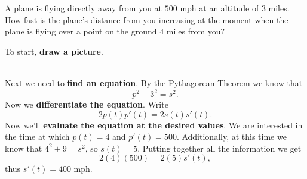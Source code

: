 \begin{example}
    \label{exam:receding airplane}
    A plane is flying directly away from you at $500$ mph at an altitude of
    $3$ miles.  How fast is the plane's distance from you increasing at the
    moment when the plane is flying over a point on the ground $4$ miles
    from you? \cite{mooc}\\
    
    \begin{solution}
    To start, \textbf{draw a picture}.
    
    \begin{figure}[H]
        \centering
    \end{figure}
    ~\\Next we need to \textbf{find an equation}. By the Pythagorean Theorem
    we know that
    \[
    p^2+3^2=s^2.
    \] 
    Now we \textbf{differentiate the equation}. Write
    \[
    2p(t)p'(t)  = 2s(t) s'(t).
    \] 
    Now we'll \textbf{evaluate the equation at the desired values}.  We
    are interested in the time at which $p(t)=4$ and $p'(t) =
    500$. Additionally, at this time we know that $4^2+9=s^2$, so
    $s(t)=5$.  Putting together all the information we get
    \[
    2(4)(500)=2(5)s'(t),
    \]
    thus $s'(t)=400$ mph.
    \end{solution}
\end{example}
\clearpage
